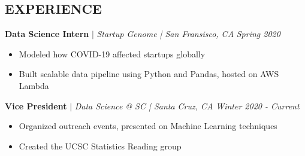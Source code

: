 \documentclass[margin]{res}
\begin{document}
\begin{resume}
\section{EXPERIENCE} 
    \textbf{Data Science Intern} $\mid$ \textit{Startup Genome | San Fransisco, CA} \hfill {\sl Spring 2020}
    \begin{itemize}
        \item Modeled how COVID-19 affected startups globally
        \item Built scalable data pipeline using Python and Pandas, hosted on AWS Lambda
    \end{itemize} \vspace*{-10pt}

    \textbf{Vice President} $\mid$ \textit{Data Science @ SC | Santa Cruz, CA} \hfill {\sl Winter 2020 - Current}
    \begin{itemize}
        \item Organized outreach events, presented on Machine Learning techniques
        \item Created the UCSC Statistics Reading group
    \end{itemize} \vspace*{-10pt}

\end{resume}
\end{document}
